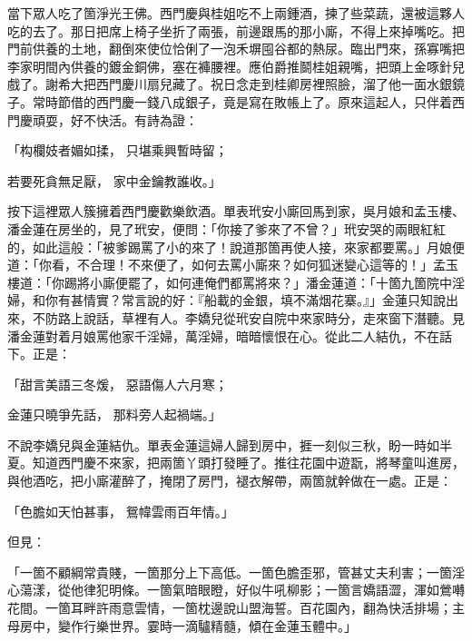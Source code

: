 當下眾人吃了箇淨光王佛。西門慶與桂姐吃不上兩鍾酒，揀了些菜蔬，還被這夥人吃的去了。那日把席上椅子坐折了兩張，前邊跟馬的那小廝，不得上來掉嘴吃。把門前供養的土地，翻倒來使位恰俐了一泡禾塀囤谷都的熱尿。臨出門來，孫寡嘴把李家明間內供養的鍍金銅佛，塞在褲腰裡。應伯爵推鬬桂姐親嘴，把頭上金啄針兒戲了。謝希大把西門慶川扇兒藏了。祝日念走到桂卿房裡照臉，溜了他一面水銀鏡子。常時節借的西門慶一錢八成銀子，竟是寫在敗帳上了。原來這起人，只伴着西門慶頑耍，好不快活。有詩為證：

「构欄妓者媚如揉，  只堪乘興暫時留；

若要死貪無足厭，  家中金鑰教誰收。」

按下這裡眾人簇擁着西門慶歡樂飲酒。單表玳安小廝回馬到家，吳月娘和孟玉樓、潘金蓮在房坐的，見了玳安，便問：「你接了爹來了不曾？」玳安哭的兩眼紅紅的，如此這般：「被爹踢罵了小的來了！說道那箇再使人接，來家都要罵。」月娘便道：「你看，不合理！不來便了，如何去罵小廝來？如何狐迷變心這等的！」孟玉樓道：「你踢將小廝便罷了，如何連俺們都罵將來？」潘金蓮道：「十箇九箇院中淫婦，和你有甚情實？常言說的好：『船載的金銀，填不滿烟花寨。』」金蓮只知說出來，不防路上說話，草裡有人。李嬌兒從玳安自院中來家時分，走來窗下潛聽。見潘金蓮對着月娘罵他家千淫婦，萬淫婦，暗暗懷恨在心。從此二人結仇，不在話下。正是：

「甜言美語三冬煖，  惡語傷人六月寒；

金蓮只曉爭先話，  那料旁人起禍端。」

不說李嬌兒與金蓮結仇。單表金蓮這婦人歸到房中，捱一刻似三秋，盼一時如半夏。知道西門慶不來家，把兩箇丫頭打發睡了。推往花園中遊翫，將琴童叫進房，與他酒吃，把小廝灌醉了，掩閉了房門，褪衣解帶，兩箇就幹做在一處。正是：

「色膽如天怕甚事，  鴛幃雲雨百年情。」

但見：

「一箇不顧綱常貴賤，一箇那分上下高低。一箇色膽歪邪，管甚丈夫利害；一箇淫心蕩漾，從他律犯明條。一箇氣暗眼瞪，好似牛吼柳影；一箇言嬌語澀，渾如鶯囀花間。一箇耳畔許雨意雲情，一箇枕邊說山盟海誓。百花園內，翻為快活排場；主母房中，變作行樂世界。霎時一滴驢精髓，傾在金蓮玉體中。」


